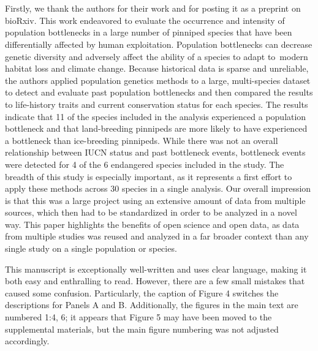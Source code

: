 \documentclass[10pt]{article}
\begin{document}
{\label{236037}}

\section*{}

{\label{463319}}

Firstly, we thank the authors for their work and for posting it as a
preprint on bioRxiv. This work endeavored to evaluate the occurrence and
intensity of population bottlenecks in a large number of pinniped
species that have been differentially affected by human exploitation.
Population bottlenecks can decrease genetic diversity and adversely
affect the ability of a species to adapt to~modern habitat loss and
climate change. Because historical data is sparse and unreliable, the
authors applied population genetics methods to a large, multi-species
dataset to detect and evaluate past population bottlenecks and then
compared the results to life-history traits and current conservation
status for each species. The results indicate that 11 of the species
included in the analysis experienced a population bottleneck and that
land-breeding pinnipeds are more likely to have experienced a bottleneck
than ice-breeding pinnipeds. While there was not an overall relationship
between IUCN status and past bottleneck events, bottleneck events were
detected for 4 of the 6 endangered species included in the study. The
breadth of this study is especially important, as it represents a first
effort to apply these methods across 30 species in a single analysis.
Our overall impression is that this was a large project using an
extensive amount of data from multiple sources, which then had to be
standardized in order to be analyzed in a novel way. This paper
highlights the benefits of open science and open data, as data from
multiple studies was reused and analyzed in a far broader context than
any single study on a single population or species.

\par\null

This manuscript is exceptionally well-written and uses clear language,
making it both easy and enthralling to read. However, there are a few
small mistakes that caused some confusion. Particularly, the caption of
Figure 4 switches the descriptions for Panels A and B. Additionally, the
figures in the main text are numbered 1:4, 6; it appears that Figure 5
may have been moved to the supplemental materials, but the main figure
numbering was not adjusted accordingly.~
\end{document}
